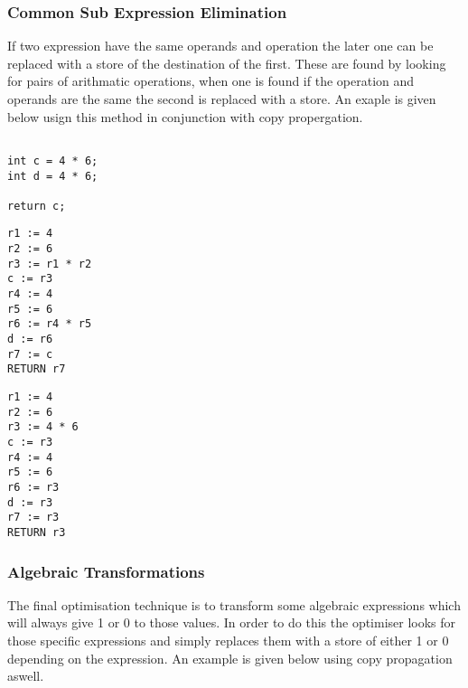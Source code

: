 \documentclass{article}
\begin{document}
\subsubsection{Common Sub Expression Elimination}
If two expression have the same operands and operation the later one can be replaced
with a store of the destination of the first. These are found by looking for pairs
of arithmatic operations, when one is found if the operation and operands are the
same the second is replaced with a store. An exaple is given below usign this method
in conjunction with copy propergation.

\begin{minipage}{0.3\textwidth}
\begin{lstlisting}

int c = 4 * 6;
int d = 4 * 6;

return c;

\end{lstlisting}
\end{minipage}%
\begin{minipage}{0.3\textwidth}
\begin{lstlisting}
r1 := 4
r2 := 6
r3 := r1 * r2
c := r3
r4 := 4
r5 := 6
r6 := r4 * r5
d := r6
r7 := c
RETURN r7
\end{lstlisting}
\end{minipage}%
\begin{minipage}{0.3\textwidth}
\begin{lstlisting}
r1 := 4
r2 := 6
r3 := 4 * 6
c := r3
r4 := 4
r5 := 6
r6 := r3
d := r3
r7 := r3
RETURN r3
\end{lstlisting}
\end{minipage}%

\subsubsection{Algebraic Transformations}

The final optimisation technique is to transform some algebraic expressions
which will always give 1 or 0 to those values. In order to do this the optimiser
looks for those specific expressions and simply replaces them with a store of either
1 or 0 depending on the expression. An example is given below using copy propagation
aswell.
\end{document}
